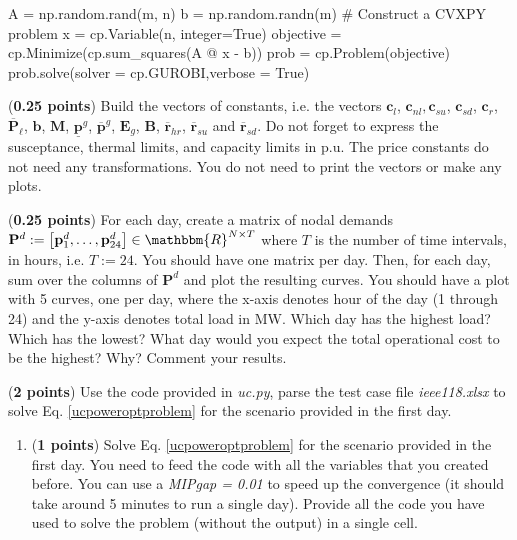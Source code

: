 \documentclass[11pt]{exam}
\begin{document}
\begin{questions}
\begin{parts}
\begin{pyin}
A = np.random.rand(m, n)
b = np.random.randn(m)
# Construct a CVXPY problem
x = cp.Variable(n, integer=True)
objective = cp.Minimize(cp.sum_squares(A @ x - b))
prob = cp.Problem(objective)
prob.solve(solver = cp.GUROBI,verbose = True)
\end{pyin}
\item (\textbf{0.25 points}) Build the vectors of constants, i.e. the vectors $\mathbf{c}_{l}$, $\mathbf{c}_{nl},\mathbf{c}_{su}$, $\mathbf{c}_{sd}$, $\mathbf{c}_{r}$, $\mathbf{\overline{P}}_{\ell}$, $\mathbf{b}$, $\mathbf{M}$, $\mathbf{\underline{p}}^g$, $\mathbf{\overline{p}}^g$, $\mathbf{E}_g$, $\mathbf{B}$, $\overline{\textbf{r}}_{hr}$, $\overline{\textbf{r}}_{su}$ and $\overline{\textbf{r}}_{sd}$. Do not forget to express the susceptance, thermal limits, and capacity limits in p.u. The price constants do not need any transformations. You do not need to print the vectors or make any plots.
\item (\textbf{0.25 points}) For each day, create a matrix of nodal demands $\mathbf{P}^d := \left[\mathbf{p}^d_1,\dots,\mathbf{p}^d_{24}\right]\in \mathbbm{R}^{N \times T}$ where $T$ is the number of time intervals, in hours, i.e. $T := 24$. You should have one matrix per day. Then, for each day, sum over the columns of $\mathbf{P}^d$ and plot the resulting curves. You should have a plot with 5 curves, one per day, where the x-axis denotes hour of the day (1 through 24) and the y-axis denotes total load in MW. Which day has the highest load? Which has the lowest? What day would you expect the total operational cost to be the highest? Why? Comment your results.
\item (\textbf{2 points}) Use the code provided in \textit{uc.py}, parse the test case file \textit{ieee118.xlsx} to solve Eq. \eqref{ucpoweroptproblem} for the scenario provided in the first day.
\begin{enumerate}
    \item (\textbf{1 points}) Solve Eq. \eqref{ucpoweroptproblem} for the scenario provided in the first day. You need to feed the code with all the variables that you created before. You can use a \textit{MIPgap = 0.01} to speed up the convergence (it should take around 5 minutes to run a single day). Provide all the code you have used to solve the problem (without the output) in a single cell.

\end{enumerate}
\end{parts}
\end{questions}
\end{document}
